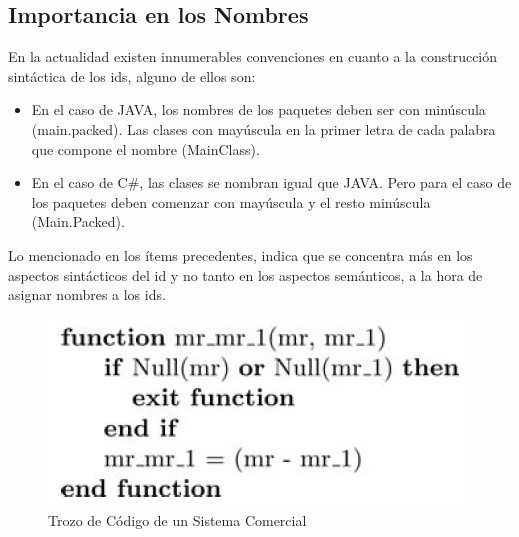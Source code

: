 

\subsection{Importancia en los Nombres}
En la actualidad existen innumerables convenciones en cuanto a la construcción sintáctica de los ids, alguno de ellos son:

\begin{itemize}
\itemsep0em%
\item En el caso de JAVA, los nombres de los paquetes deben ser con minúscula (main.packed). Las clases con mayúscula en la primer letra de cada palabra que compone el nombre (MainClass).

\item En el caso de C\#, las clases se nombran igual que JAVA. Pero para el caso de los paquetes deben comenzar con mayúscula y el resto minúscula (Main.Packed).
\end{itemize}

Lo mencionado en los ítems precedentes, indica que se concentra más en los aspectos sintácticos del id y no tanto en los aspectos semánticos, a la hora de asignar nombres a los ids.




\begin{figure}[t] %
\centering
\includegraphics[scale= 0.70]{./cap3/idd_1.png}
\caption{Trozo de Código de un Sistema Comercial}
\label{captura2}
\end{figure}

